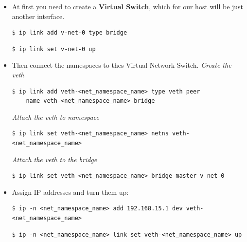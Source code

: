 \documentclass{article}
\newenvironment{codetemplate}[1][]{%
  \mybasecolorbox[#1]
  \itshape
}{%
  \endmybasecolorbox
}
\begin{document}
\begin{itemize}
    \item At first you need to create a \textbf{Virtual Switch}, which for our host will be just another interface.
\begin{codetemplate}{}
\begin{verbatim}
$ ip link add v-net-0 type bridge
\end{verbatim}
\end{codetemplate}
\begin{codetemplate}{}
\begin{verbatim}
$ ip link set v-net-0 up
\end{verbatim}
\end{codetemplate}
    \item Then connect the namespaces to thes Virtual Network Switch.
\begin{codetemplate}{Create the veth}
\begin{verbatim}
$ ip link add veth-<net_namespace_name> type veth peer 
    name veth-<net_namespace_name>-bridge
\end{verbatim}
\end{codetemplate}
\begin{codetemplate}{Attach the veth to namespace}
\begin{verbatim}
$ ip link set veth-<net_namespace_name> netns veth-<net_namespace_name>
\end{verbatim}
\end{codetemplate}
\begin{codetemplate}{Attach the veth to the bridge}
\begin{verbatim}
$ ip link set veth-<net_namespace_name>-bridge master v-net-0
\end{verbatim}
\end{codetemplate}
    \item Assign IP addresses and turn them up:
\begin{codetemplate}{}
\begin{verbatim}
$ ip -n <net_namespace_name> add 192.168.15.1 dev veth-<net_namespace_name>
\end{verbatim}
\end{codetemplate}
\begin{codetemplate}{}
\begin{verbatim}
$ ip -n <net_namespace_name> link set veth-<net_namespace_name> up
\end{verbatim}
\end{codetemplate}
\end{itemize}
\end{document}
